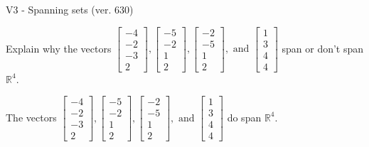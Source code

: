 \begin{exercise}
  \begin{exerciseTitle}V3 - Spanning sets (ver. 630)\end{exerciseTitle}
  \begin{exerciseStatement}
    Explain why the vectors \(\left[\begin{array}{r}
-4 \\
-2 \\
-3 \\
2
\end{array}\right] , \left[\begin{array}{r}
-5 \\
-2 \\
1 \\
2
\end{array}\right] , \left[\begin{array}{r}
-2 \\
-5 \\
1 \\
2
\end{array}\right] , \text{ and } \left[\begin{array}{r}
1 \\
3 \\
4 \\
4
\end{array}\right]\) span or don't span \(\mathbb{R}^4\). 
	


  \end{exerciseStatement}
  \begin{exerciseAnswer}
   The vectors \(\left[\begin{array}{r}
-4 \\
-2 \\
-3 \\
2
\end{array}\right] , \left[\begin{array}{r}
-5 \\
-2 \\
1 \\
2
\end{array}\right] , \left[\begin{array}{r}
-2 \\
-5 \\
1 \\
2
\end{array}\right] , \text{ and } \left[\begin{array}{r}
1 \\
3 \\
4 \\
4
\end{array}\right]\) 
  	 do  
	span \(\mathbb{R}^4\).
  


  \end{exerciseAnswer}
\end{exercise}